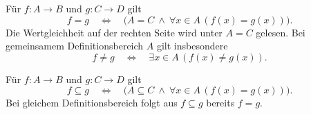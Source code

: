\begin{theorem}[Funktionsextensionalität]
\label{b05guide:thm:extensionality}
Für $f\colon A\to B$ und $g\colon C\to D$ gilt
\[
 f=g\quad\Longleftrightarrow\quad
 \bigl(A=C\ \land\ \forall x\in A\,(f(x)=g(x))\bigr).
\]
Die Wertgleichheit auf der rechten Seite wird unter $A=C$ gelesen.
Bei gemeinsamem Definitionsbereich $A$ gilt insbesondere
\[
 f\ne g\quad\Longleftrightarrow\quad
 \exists x\in A\,(f(x)\ne g(x)).
\]
\end{theorem}

\begin{theorem}
\label{b05guide:thm:graphinclusion}
Für $f\colon A\to B$ und $g\colon C\to D$ gilt
\[
 f\subseteq g\quad\Longleftrightarrow\quad
 \bigl(A\subseteq C\ \land\ \forall x\in A\,(f(x)=g(x))\bigr).
\]
Bei gleichem Definitionsbereich folgt aus $f\subseteq g$ bereits $f=g$.
\end{theorem}
